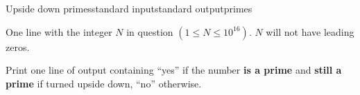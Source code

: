 \begin{problem}{Upside down primes}{standard input}{standard output}{primes}
\InputFile

One line with the integer $N$ in question $(1 \leq N \leq 10^{16})$. $N$ will not have leading
zeros.

\OutputFile
Print one line of output containing ``yes'' if the number \textbf{is a prime} and
\textbf{still a prime} if turned upside down, ``no'' otherwise.\\

\Example

\begin{example}
%
%
%
\end{example}

\end{problem}
